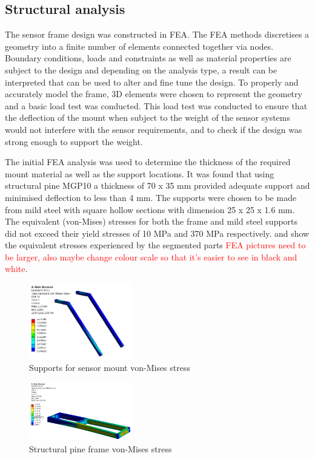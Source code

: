 \documentclass[main.tex]{subfiles}
\begin{document}
\subsection{Structural analysis}
The sensor frame design was constructed in FEA. The FEA methods discretises a geometry into a finite number of elements connected together via nodes. Boundary conditions, loads and constraints as well as material properties are subject to the design and depending on the analysis type, a result can be interpreted that can be used to alter and fine tune the design.  To properly and accurately model the frame, 3D elements were chosen to represent the geometry and a basic load test was conducted. This load test was conducted to ensure that the deflection of the mount when subject to the weight of the sensor systems would not interfere with the sensor requirements, and to check if the design was strong enough to support the weight.

The initial FEA analysis was used to determine the thickness of the required mount material as well as the support locations. It was found that using structural pine MGP10 a thickness of 70 x 35 mm provided adequate support and minimised deflection to less than 4 mm. The supports were chosen to be made from mild steel with square hollow sections with dimension 25 x 25 x 1.6 mm. The equivalent (von-Mises) stresses for both the frame and mild steel supports did not exceed their yield stresses of 10 MPa and 370 MPa respectively.  and  show the equivalent stresses experienced by the segmented parts \textcolor{red}{FEA pictures need to be larger, also maybe change colour scale so that it's easier to see in black and white}. 

\begin{figure}[ht]
\includegraphics[width=0.4\textwidth]{4-DetailedDesign/top_frame.PNG}
\centering
\caption{Supports for sensor mount von-Mises stress} 
\end{figure}

\begin{figure}[ht]
\includegraphics[width=0.4\textwidth]{4-DetailedDesign/bottomframe.PNG}
\centering
\caption{Structural pine frame von-Mises stress} 
\end{figure}
\end{document}
